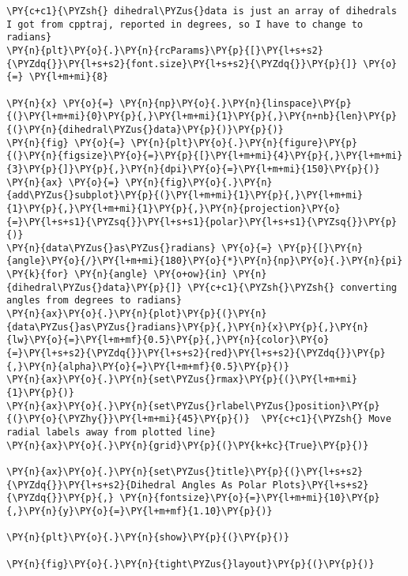     \begin{tcolorbox}[breakable, size=fbox, boxrule=1pt, pad at break*=1mm,colback=cellbackground, colframe=cellborder]
\begin{Verbatim}[commandchars=\\\{\}]
\PY{c+c1}{\PYZsh{} dihedral\PYZus{}data is just an array of dihedrals I got from cpptraj, reported in degrees, so I have to change to radians}
\PY{n}{plt}\PY{o}{.}\PY{n}{rcParams}\PY{p}{[}\PY{l+s+s2}{\PYZdq{}}\PY{l+s+s2}{font.size}\PY{l+s+s2}{\PYZdq{}}\PY{p}{]} \PY{o}{=} \PY{l+m+mi}{8}

\PY{n}{x} \PY{o}{=} \PY{n}{np}\PY{o}{.}\PY{n}{linspace}\PY{p}{(}\PY{l+m+mi}{0}\PY{p}{,}\PY{l+m+mi}{1}\PY{p}{,}\PY{n+nb}{len}\PY{p}{(}\PY{n}{dihedral\PYZus{}data}\PY{p}{)}\PY{p}{)}
\PY{n}{fig} \PY{o}{=} \PY{n}{plt}\PY{o}{.}\PY{n}{figure}\PY{p}{(}\PY{n}{figsize}\PY{o}{=}\PY{p}{[}\PY{l+m+mi}{4}\PY{p}{,}\PY{l+m+mi}{3}\PY{p}{]}\PY{p}{,}\PY{n}{dpi}\PY{o}{=}\PY{l+m+mi}{150}\PY{p}{)}
\PY{n}{ax} \PY{o}{=} \PY{n}{fig}\PY{o}{.}\PY{n}{add\PYZus{}subplot}\PY{p}{(}\PY{l+m+mi}{1}\PY{p}{,}\PY{l+m+mi}{1}\PY{p}{,}\PY{l+m+mi}{1}\PY{p}{,}\PY{n}{projection}\PY{o}{=}\PY{l+s+s1}{\PYZsq{}}\PY{l+s+s1}{polar}\PY{l+s+s1}{\PYZsq{}}\PY{p}{)}
\PY{n}{data\PYZus{}as\PYZus{}radians} \PY{o}{=} \PY{p}{[}\PY{n}{angle}\PY{o}{/}\PY{l+m+mi}{180}\PY{o}{*}\PY{n}{np}\PY{o}{.}\PY{n}{pi} \PY{k}{for} \PY{n}{angle} \PY{o+ow}{in} \PY{n}{dihedral\PYZus{}data}\PY{p}{]} \PY{c+c1}{\PYZsh{}\PYZsh{} converting angles from degrees to radians}
\PY{n}{ax}\PY{o}{.}\PY{n}{plot}\PY{p}{(}\PY{n}{data\PYZus{}as\PYZus{}radians}\PY{p}{,}\PY{n}{x}\PY{p}{,}\PY{n}{lw}\PY{o}{=}\PY{l+m+mf}{0.5}\PY{p}{,}\PY{n}{color}\PY{o}{=}\PY{l+s+s2}{\PYZdq{}}\PY{l+s+s2}{red}\PY{l+s+s2}{\PYZdq{}}\PY{p}{,}\PY{n}{alpha}\PY{o}{=}\PY{l+m+mf}{0.5}\PY{p}{)}
\PY{n}{ax}\PY{o}{.}\PY{n}{set\PYZus{}rmax}\PY{p}{(}\PY{l+m+mi}{1}\PY{p}{)}
\PY{n}{ax}\PY{o}{.}\PY{n}{set\PYZus{}rlabel\PYZus{}position}\PY{p}{(}\PY{o}{\PYZhy{}}\PY{l+m+mi}{45}\PY{p}{)}  \PY{c+c1}{\PYZsh{} Move radial labels away from plotted line}
\PY{n}{ax}\PY{o}{.}\PY{n}{grid}\PY{p}{(}\PY{k+kc}{True}\PY{p}{)}

\PY{n}{ax}\PY{o}{.}\PY{n}{set\PYZus{}title}\PY{p}{(}\PY{l+s+s2}{\PYZdq{}}\PY{l+s+s2}{Dihedral Angles As Polar Plots}\PY{l+s+s2}{\PYZdq{}}\PY{p}{,} \PY{n}{fontsize}\PY{o}{=}\PY{l+m+mi}{10}\PY{p}{,}\PY{n}{y}\PY{o}{=}\PY{l+m+mf}{1.10}\PY{p}{)}

\PY{n}{plt}\PY{o}{.}\PY{n}{show}\PY{p}{(}\PY{p}{)}

\PY{n}{fig}\PY{o}{.}\PY{n}{tight\PYZus{}layout}\PY{p}{(}\PY{p}{)}
\end{Verbatim}
\end{tcolorbox}

